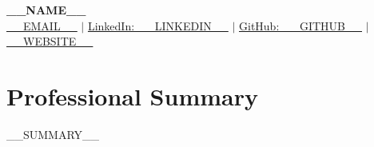 \documentclass[letterpaper,11pt]{article}
\newcommand{\resumeItem}[1]{
  \item\small{
    {#1 \vspace{-2pt}}
  }
}
\newcommand{\resumeSubHeadingListStart}{\begin{itemize}[leftmargin=0.15in, label={}]}
\newcommand{\resumeSubHeadingListEnd}{\end{itemize}}
\begin{document}

\hypersetup{urlcolor = black} %

\begin{center}
    \textbf{\LARGE __NAME__} \\ \vspace{3pt}
    \small
     \hspace{.5pt} {\underline{__EMAIL__}}
    $|$
     \hspace{.5pt} {\underline{LinkedIn: __LINKEDIN__}}
    $|$
     \hspace{.5pt} {\underline{GitHub: __GITHUB__}}
    $|$
 \hspace{.5pt} {\underline{__WEBSITE__}}
\end{center}
\vspace{-18pt}

\hypersetup{urlcolor = linkcolor} %

\section{Professional Summary}
__SUMMARY__


\end{document}
